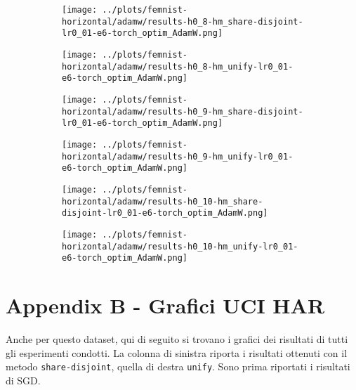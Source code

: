 \begin{figure}[htbp]  %
    \centering
    \begin{subfigure}[b]{0.47\textwidth}
        \centering
        \texttt{[image: ../plots/femnist-horizontal/adamw/results-h0\_8-hm\_share-disjoint-lr0\_01-e6-torch\_optim\_AdamW.png]}
    \end{subfigure}
    \hfill
    \begin{subfigure}[b]{0.47\textwidth}
        \centering
        \texttt{[image: ../plots/femnist-horizontal/adamw/results-h0\_8-hm\_unify-lr0\_01-e6-torch\_optim\_AdamW.png]}
    \end{subfigure}
\end{figure}
\begin{figure}[htbp]  %
    \centering
    \begin{subfigure}[b]{0.47\textwidth}
        \centering
        \texttt{[image: ../plots/femnist-horizontal/adamw/results-h0\_9-hm\_share-disjoint-lr0\_01-e6-torch\_optim\_AdamW.png]}
    \end{subfigure}
    \hfill
    \begin{subfigure}[b]{0.47\textwidth}
        \centering
        \texttt{[image: ../plots/femnist-horizontal/adamw/results-h0\_9-hm\_unify-lr0\_01-e6-torch\_optim\_AdamW.png]}
    \end{subfigure}
\end{figure}
\begin{figure}[htbp]  %
    \centering
    \begin{subfigure}[b]{0.47\textwidth}
        \centering
        \texttt{[image: ../plots/femnist-horizontal/adamw/results-h0\_10-hm\_share-disjoint-lr0\_01-e6-torch\_optim\_AdamW.png]}
    \end{subfigure}
    \hfill
    \begin{subfigure}[b]{0.47\textwidth}
        \centering
        \texttt{[image: ../plots/femnist-horizontal/adamw/results-h0\_10-hm\_unify-lr0\_01-e6-torch\_optim\_AdamW.png]}
    \end{subfigure}
\end{figure}

\chapter{Appendix B - Grafici UCI HAR}
Anche per questo dataset, qui di seguito si trovano i grafici dei
risultati di tutti gli esperimenti condotti. La colonna di sinistra 
riporta i risultati ottenuti con il metodo \texttt{share-disjoint}, 
quella di destra \texttt{unify}. Sono prima riportati i risultati 
di SGD.

